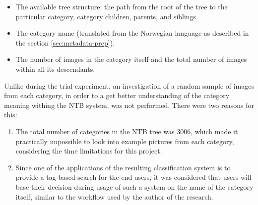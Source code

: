     \begin{itemize}
        \item The available tree structure: the path from the root of the tree to the particular category, category children, parents, and siblings.
        \item The category name (translated from the Norwegian language as described in the section \ref{sec:metadata-prep}).
        \item The number of images in the category itself and the total number of images within all its descendants.
    \end{itemize}
    
    
    Unlike during the trial experiment, an investigation of a random sample of images from each category, in order to a get better understanding of the category meaning withing the NTB system, was not performed. There were two reasons for this:
    
    \begin{enumerate}
        \item The total number of categories in the NTB tree was 3006, which made it practically impossible to look into example pictures from each category, considering the time limitations for this project. 
        \item Since one of the applications of the resulting classification system is to provide a tag-based search for the end users, it was considered that users will base their decision during usage of such a system on the name of the category itself, similar to the workflow used by the author of the research.
    \end{enumerate}
    
